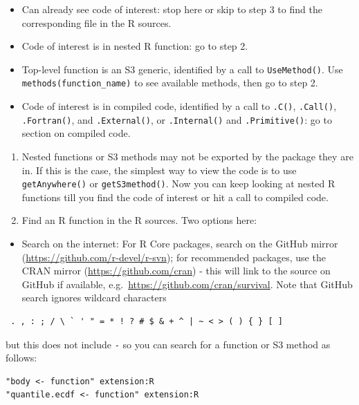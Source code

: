 \documentclass[
]{book}
\providecommand{\tightlist}{%
  \setlength{\itemsep}{0pt}\setlength{\parskip}{0pt}}
\begin{document}
\begin{itemize}
\item
  Can already see code of interest: stop here or skip to step 3 to find the corresponding file in the R sources.
\item
  Code of interest is in nested R function: go to step 2.
\item
  Top-level function is an S3 generic, identified by a call to \texttt{UseMethod()}. Use \texttt{methods(function\_name)} to see available methods, then go to step 2.
\item
  Code of interest is in compiled code, identified by a call to \texttt{.C()}, \texttt{.Call()}, \texttt{.Fortran()}, and \texttt{.External()}, or \texttt{.Internal()} and \texttt{.Primitive()}: go to section on compiled code.
\end{itemize}

\begin{enumerate}
\def\labelenumi{\arabic{enumi}.}
\setcounter{enumi}{1}
\item
  Nested functions or S3 methods may not be exported by the package they are in. If this is the case, the simplest way to view the code is to use \texttt{getAnywhere()} or \texttt{getS3method()}. Now you can keep looking at nested R functions till you find the code of interest or hit a call to compiled code.
\item
  Find an R function in the R sources. Two options here:
\end{enumerate}

\begin{itemize}
\tightlist
\item
  Search on the internet: For R Core packages, search on the GitHub mirror (\url{https://github.com/r-devel/r-svn}); for recommended packages, use the CRAN mirror (\url{https://github.com/cran}) - this will link to the source on GitHub if available, e.g.~\url{https://github.com/cran/survival}. Note that GitHub search ignores wildcard characters
\end{itemize}

\begin{verbatim}
 . , : ; / \ ` ' " = * ! ? # $ & + ^ | ~ < > ( ) { } [ ]
\end{verbatim}

but this does not include \texttt{-} so you can search for a function or S3 method as follows:

\begin{verbatim}
"body <- function" extension:R
"quantile.ecdf <- function" extension:R
\end{verbatim}
\end{document}
